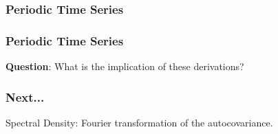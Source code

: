 \documentclass[%
xcolor=pdftex]{beamer}
\begin{document}
\begin{frame}
\frametitle{Periodic Time Series}



\end{frame}

\begin{frame}
\frametitle{Periodic Time Series}

\textbf{Question}: What is the implication of these derivations?

\vspace{50mm}

\end{frame}

\begin{frame}
\frametitle{Next...}

Spectral Density: Fourier transformation of the autocovariance.


\end{frame}
\end{document}
